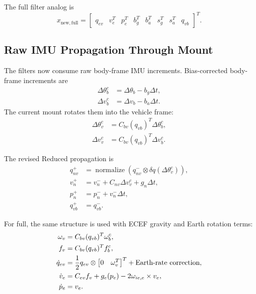 \documentclass[11pt]{article}
\newcommand{\T}{^{T}}
\newcommand{\dt}{\Delta t}
\newcommand{\dq}{\delta q}
\begin{document}
The full filter analog is
\begin{equation}
  x_{\mathrm{new,full}} =
  \begin{bmatrix}
  q_{ev} & v_e\T & p_e\T & b_g\T & b_a\T &
  s_g\T & s_a\T & q_{vb}
  \end{bmatrix}\T .
\end{equation}

\subsection{Raw IMU Propagation Through Mount}

The filters now consume raw body-frame IMU increments. Bias-corrected body-frame
increments are
\begin{align}
  \Delta\theta_b^c &= \Delta\theta_b - b_g\dt,\\
  \Delta v_b^c &= \Delta v_b - b_a\dt.
\end{align}
The current mount rotates them into the vehicle frame:
\begin{align}
  \Delta\theta_v^c &= C_{bv}(q_{vb})\T \Delta\theta_b^c,\\
  \Delta v_v^c &= C_{bv}(q_{vb})\T \Delta v_b^c.
\end{align}

The revised Reduced propagation is
\begin{align}
  q_{nv}^{+} &=
    \operatorname{normalize}\left(q_{nv}^{-}\otimes
    \dq(\Delta\theta_v^c)\right),\\
  v_n^{+} &= v_n^{-}+C_{nv}\Delta v_v^c+g_n\dt,\\
  p_n^{+} &= p_n^{-}+v_n^{-}\dt,\\
  q_{vb}^{+} &= q_{vb}^{-}.
\end{align}

For full, the same structure is used with ECEF gravity and Earth rotation
terms:
\begin{align}
  \omega_v &= C_{bv}(q_{vb})\T\omega_b^c,\\
  f_v &= C_{bv}(q_{vb})\T f_b^c,\\
  \dot q_{ev} &=
    \frac{1}{2}q_{ev}\otimes
    \begin{bmatrix}0 & \omega_v\T\end{bmatrix}\T
    + \hbox{Earth-rate correction},\\
  \dot v_e &= C_{ev}f_v + g_e(p_e) - 2\omega_{ie,e}\times v_e,\\
  \dot p_e &= v_e.
\end{align}
\end{document}
